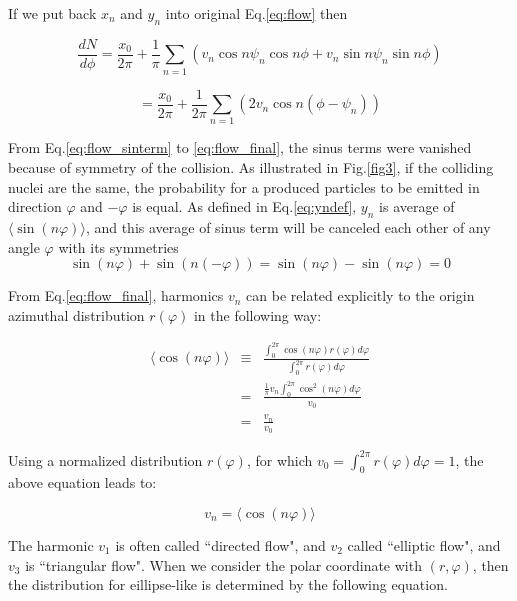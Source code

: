 If we put back $x_n$ and $y_n$ into original Eq.\ref{eq:flow}  then

\begin{equation}
\frac{dN}{d\phi}=\frac{x_0}{2\pi}+\frac{1}{\pi}\sum_{n=1}{(v_n\cos{n\psi_n}\cos{n\phi}+v_n\sin{n\psi_n}\sin{n\phi})}
\label{eq:flow_sinterm}
\end{equation}

\begin{equation}
=\frac{x_0}{2\pi}+\frac{1}{2\pi}\sum_{n=1}{(2v_n\cos{n(\phi-\psi_n)})}
\label{eq:flow_final}
\end{equation}
\smallskip


From Eq.\ref{eq:flow_sinterm} to \ref{eq:flow_final}, the sinus terms were vanished because of symmetry of the collision. As illustrated in Fig.\ref{fig3}, if the colliding nuclei are the same, the probability for a produced particles to be emitted in direction $\varphi$ and $-\varphi$ is equal. As defined in Eq.\ref{eq:yndef}, $y_n$ is average of $\langle \sin(n\varphi) \rangle$, and this average of sinus term will be canceled each other of any angle $\varphi$ with its symmetries
\begin{equation}
	\sin(n\varphi) + \sin(n(-\varphi)) = \sin(n\varphi) - \sin(n\varphi) =0
\end{equation}

From Eq.\ref{eq:flow_final}, harmonics $v_n$ can be related explicitly to the origin azimuthal distribution $r(\varphi)$ in the following way:

\begin{eqnarray}
	\langle \cos(n\varphi) \rangle &\equiv& \frac{\int_{0}^{2\pi}{\cos(n\varphi)r(\varphi)d\varphi}}{\int_0^{2\pi}{r(\varphi)d\varphi}} \\
	&=&\frac{\frac{1}{\pi} v_n \int_{0}^{2\pi}{\cos^2(n\varphi)d\varphi}}{v_0} \\ 
	&=& \frac{v_n}{v_0}
	\label{eq:vncal}
\end{eqnarray}

Using a normalized distribution $r( \varphi )$, for which $v_0 = \int_{0}^{2\pi}{r ( \varphi )} d\varphi = 1$, the above equation leads to:
	
\begin{equation}
	v_n = \langle \cos(n\varphi) \rangle 	
\end{equation}
\smallskip


	The harmonic $v_1$ is often called ``directed flow", and $v_2$ called ``elliptic flow", and $v_3$ is ``triangular flow". When we consider the polar coordinate with $(r, \varphi)$, then the distribution for eillipse-like is determined by the following equation. 
	

